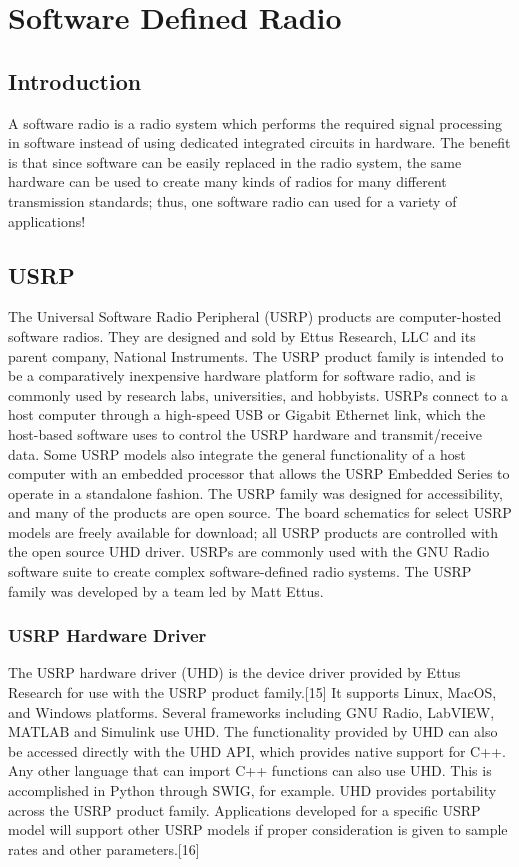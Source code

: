 \chapter{Software Defined Radio}


\section{Introduction}
A software radio is a radio system which performs the required signal processing in software instead of using dedicated integrated circuits in hardware. The benefit is that since software can be easily replaced in the radio system, the same hardware can be used to create many kinds of radios for many different transmission standards; thus, one software radio can used for a variety of applications!


\section{USRP}
The Universal Software Radio Peripheral (USRP) products are computer-hosted software radios. They are designed and sold by Ettus Research, LLC and its parent company, National Instruments. The USRP product family is intended to be a comparatively inexpensive hardware platform for software radio, and is commonly used by research labs, universities, and hobbyists. USRPs connect to a host computer through a high-speed USB or Gigabit Ethernet link, which the host-based software uses to control the USRP hardware and transmit/receive data. Some USRP models also integrate the general functionality of a host computer with an embedded processor that allows the USRP Embedded Series to operate in a standalone fashion.
The USRP family was designed for accessibility, and many of the products are open source. The board schematics for select USRP models are freely available for download; all USRP products are controlled with the open source UHD driver. USRPs are commonly used with the GNU Radio software suite to create complex software-defined radio systems.
The USRP family was developed by a team led by Matt Ettus.
\subsection{USRP Hardware Driver}
The USRP hardware driver (UHD) is the device driver provided by Ettus Research for use with the USRP product family.[15] It supports Linux, MacOS, and Windows platforms. Several frameworks including GNU Radio, LabVIEW, MATLAB and Simulink use UHD. The functionality provided by UHD can also be accessed directly with the UHD API, which provides native support for C++. Any other language that can import C++ functions can also use UHD. This is accomplished in Python through SWIG, for example.
UHD provides portability across the USRP product family. Applications developed for a specific USRP model will support other USRP models if proper consideration is given to sample rates and other parameters.[16]

